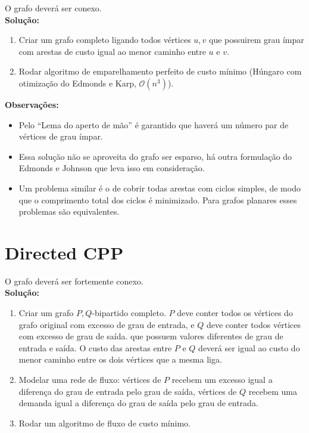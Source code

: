 \documentclass{article}
\begin{document}
O grafo deverá ser conexo.
\\

\textbf{Solução:} 
\begin{enumerate}
    \item Criar um grafo completo ligando todos vértices $u, v$ que possuirem grau ímpar com arestas de custo igual ao menor caminho entre $u$ e $v$. 
    \item Rodar algoritmo de emparelhamento perfeito de custo mínimo (Húngaro com otimização do Edmonds e Karp, $\mathcal{O}(n^3)$).
\end{enumerate}


\textbf{Observações:}
\begin{itemize}
		\item Pelo ``Lema do aperto de mão'' é garantido que haverá um número par de vértices de grau ímpar.
		\item Essa solução não se aproveita do grafo ser esparso, há outra formulação do Edmonds e Johnson que leva isso em consideração.
		\item Um problema similar é o de cobrir todas arestas com ciclos simples, de modo que o comprimento total dos ciclos é minimizado. Para grafos planares esses problemas são equivalentes.
	\end{itemize}

	\section{Directed CPP}

	O grafo deverá ser fortemente conexo.\\

	\textbf{Solução:}
	\begin{enumerate}
		\item Criar um grafo $P, Q$-bipartido completo. $P$ deve conter todos os vértices do grafo original com excesso de grau de entrada, e $Q$ deve conter todos vértices com excesso de grau de saída. que possuem valores diferentes de grau de entrada e saída. O custo das arestas entre $P$ e $Q$ deverá ser igual ao custo do menor caminho entre os dois vértices que a mesma liga.
		\item Modelar uma rede de fluxo: vértices de $P$ recebem um excesso igual a diferença do grau de entrada pelo grau de saída, vértices de $Q$ recebem uma demanda igual a diferença do grau de saída pelo grau de entrada. 
		\item Rodar um algoritmo de fluxo de custo mínimo. 
	\end{enumerate}
\end{document}
